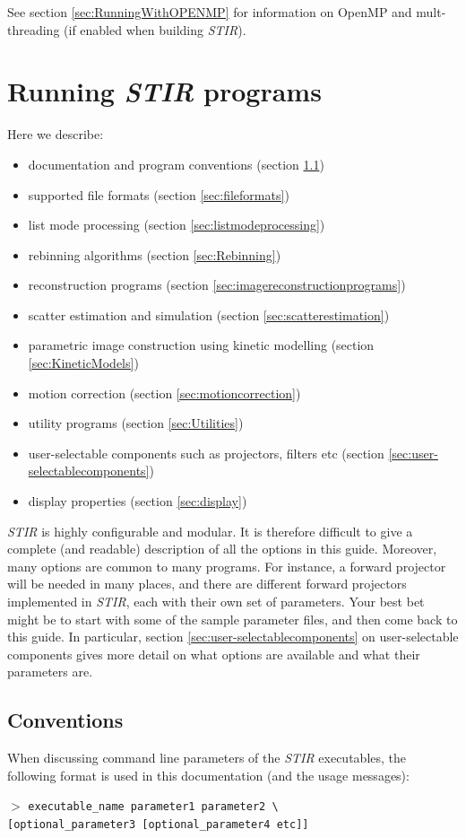 \documentclass{article}
\newcommand{\cmdline}[1]{\par \noindent $>$ \texttt{#1}\par}
\begin{document}
See section \ref{sec:RunningWithOPENMP} for information on OpenMP and mult-threading (if enabled when building \textit{STIR}).

\section{
Running \textit{STIR} programs}

Here we describe:
\begin{itemize}
\item documentation and program conventions (section \ref{sec:conventions})
\item supported file formats (section \ref{sec:fileformats})
\item list mode processing (section \ref{sec:listmodeprocessing})
\item rebinning algorithms (section \ref{sec:Rebinning})
\item reconstruction programs (section \ref{sec:imagereconstructionprograms})
\item scatter estimation and simulation (section \ref{sec:scatterestimation})
\item parametric image construction using kinetic modelling (section \ref{sec:KineticModels})
\item motion correction (section \ref{sec:motioncorrection})
\item utility programs (section \ref{sec:Utilities})
\item user-selectable components such as projectors, filters etc (section \ref{sec:user-selectablecomponents})
\item display properties (section \ref{sec:display})
\end{itemize}

\textit{STIR} is highly configurable and modular. It is therefore difficult to give a complete (and readable)
description of all the options in this guide. Moreover, many options are common to many
programs. For instance, a forward projector will be needed in many places, and there are 
different forward projectors implemented in \textit{STIR}, each with their own set of 
parameters. Your best bet might be to start with some of the sample parameter files, and then
come back to this guide. In particular, section \ref{sec:user-selectablecomponents}
on user-selectable components gives more detail on what options are available
and what their parameters are.

\subsection{
Conventions}
\label{sec:conventions}
When discussing command line parameters of the \textit{STIR} executables, 
the following format is used in this documentation (and the usage messages):
\cmdline{executable\_name parameter1 parameter2 {\textbackslash}\\
{[}optional\_parameter3 [optional\_parameter4 etc]]}
\end{document}

